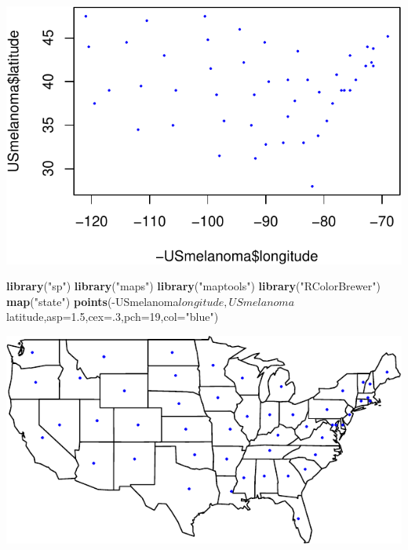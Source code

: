\documentclass[]{article}
\newenvironment{Shaded}{\begin{snugshade}}{\end{snugshade}}
\newcommand{\KeywordTok}[1]{\textcolor[rgb]{0.13,0.29,0.53}{\textbf{{#1}}}}
\newcommand{\DataTypeTok}[1]{\textcolor[rgb]{0.13,0.29,0.53}{{#1}}}
\newcommand{\DecValTok}[1]{\textcolor[rgb]{0.00,0.00,0.81}{{#1}}}
\newcommand{\FloatTok}[1]{\textcolor[rgb]{0.00,0.00,0.81}{{#1}}}
\newcommand{\StringTok}[1]{\textcolor[rgb]{0.31,0.60,0.02}{{#1}}}
\newcommand{\NormalTok}[1]{{#1}}
\numberwithin{equation}{section}
\begin{document}
\begin{center}\includegraphics{tema1_files/figure-latex/unnamed-chunk-162-1} \end{center}

\begin{Shaded}
\begin{Highlighting}[]
\KeywordTok{library}\NormalTok{(}\StringTok{"sp"}\NormalTok{)}
\KeywordTok{library}\NormalTok{(}\StringTok{"maps"}\NormalTok{)}
\KeywordTok{library}\NormalTok{(}\StringTok{"maptools"}\NormalTok{)}
\KeywordTok{library}\NormalTok{(}\StringTok{"RColorBrewer"}\NormalTok{)}
\KeywordTok{map}\NormalTok{(}\StringTok{"state"}\NormalTok{)}
\KeywordTok{points}\NormalTok{(-USmelanoma$longitude,USmelanoma$latitude,}\DataTypeTok{asp=}\FloatTok{1.5}\NormalTok{,}\DataTypeTok{cex=}\NormalTok{.}\DecValTok{3}\NormalTok{,}\DataTypeTok{pch=}\DecValTok{19}\NormalTok{,}\DataTypeTok{col=}\StringTok{"blue"}\NormalTok{)}
\end{Highlighting}
\end{Shaded}

\begin{center}\includegraphics{tema1_files/figure-latex/unnamed-chunk-163-1} \end{center}
\end{document}
